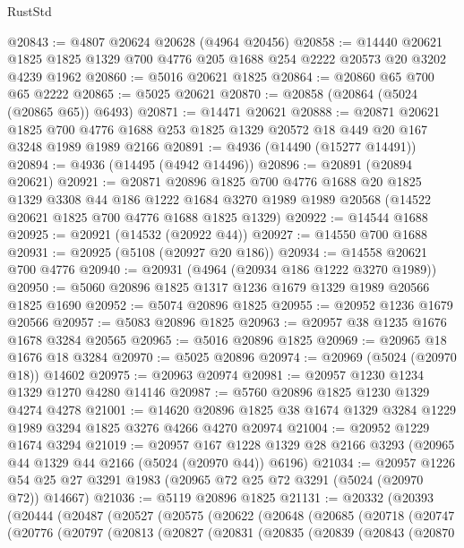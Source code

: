 \begin{lexlean}{RustStd}
\begin{coremodule}
@20843 := @4807 @20624 @20628 (@4964 @20456)
@20858 := @14440
    @20621
    @1825
    @1825
    @1329
    @700
    @4776
    @205
    @1688
    @254
    @2222
    @20573
    @20
    @3202
    @4239
    @1962
@20860 := @5016 @20621 @1825
@20864 := @20860 @65 @700 @65 @2222
@20865 := @5025 @20621
@20870 := @20858 (@20864 (@5024 (@20865 @65)) @6493)
@20871 := @14471 @20621
@20888 := @20871
    @20621
    @1825
    @700
    @4776
    @1688
    @253
    @1825
    @1329
    @20572
    @18
    @449
    @20
    @167
    @3248
    @1989
    @1989
    @2166
@20891 := @4936 (@14490 (@15277 @14491))
@20894 := @4936 (@14495 (@4942 @14496))
@20896 := @20891 (@20894 @20621)
@20921 := @20871
    @20896
    @1825
    @700
    @4776
    @1688
    @20
    @1825
    @1329
    @3308
    @44
    @186
    @1222
    @1684
    @3270
    @1989
    @1989
    @20568
    (@14522 @20621 @1825 @700 @4776 @1688 @1825 @1329)
@20922 := @14544 @1688
@20925 := @20921 (@14532 (@20922 @44))
@20927 := @14550 @700 @1688
@20931 := @20925 (@5108 (@20927 @20 @186))
@20934 := @14558 @20621 @700 @4776
@20940 := @20931 (@4964 (@20934 @186 @1222 @3270 @1989))
@20950 := @5060 @20896 @1825 @1317 @1236 @1679 @1329 @1989 @20566 @1825 @1690
@20952 := @5074 @20896 @1825
@20955 := @20952 @1236 @1679 @20566
@20957 := @5083 @20896 @1825
@20963 := @20957 @38 @1235 @1676 @1678 @3284 @20565
@20965 := @5016 @20896 @1825
@20969 := @20965 @18 @1676 @18 @3284
@20970 := @5025 @20896
@20974 := @20969 (@5024 (@20970 @18)) @14602
@20975 := @20963 @20974
@20981 := @20957 @1230 @1234 @1329 @1270 @4280 @14146
@20987 := @5760 @20896 @1825 @1230 @1329 @4274 @4278
@21001 := @14620 @20896 @1825 @38 @1674 @1329 @3284 @1229 @1989 @3294 @1825 @3276 @4266 @4270 @20974
@21004 := @20952 @1229 @1674 @3294
@21019 := @20957
    @167
    @1228
    @1329
    @28
    @2166
    @3293
    (@20965 @44 @1329 @44 @2166 (@5024 (@20970 @44)) @6196)
@21034 := @20957
    @1226
    @54
    @25
    @27
    @3291
    @1983
    (@20965 @72 @25 @72 @3291 (@5024 (@20970 @72)) @14667)
@21036 := @5119 @20896 @1825
@21131 := @20332
    (@20393
      (@20444
        (@20487
          (@20527
            (@20575
              (@20622
                (@20648
                  (@20685
                    (@20718
                      (@20747
                        (@20776
                          (@20797
                            (@20813
                              (@20827
                                (@20831
                                  (@20835
                                    (@20839
                                      (@20843
                                        (@20870

\end{coremodule}
\end{lexlean}
